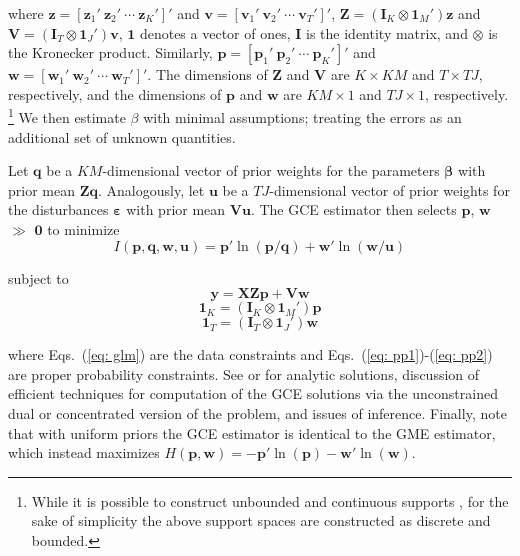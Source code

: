 \documentclass{elsarticle}
\begin{document}
\noindent
where $\mathbf{z}=[\mathbf{z}_1' ~ \mathbf{z}_2' ~ \cdots ~ 
\mathbf{z}_K' ]'$ and $\mathbf{v}=[\mathbf{v}_1' ~ \mathbf{v}_2' ~ 
\cdots ~ \mathbf{v}_T' ]'$, 
$\mathbf{Z}= (\mathbf{I}_K \otimes \mathbf{1}_M')\mathbf{z}$ and
$\mathbf{V}= (\mathbf{I}_T \otimes \mathbf{1}_J')\mathbf{v}$, $\mathbf{1}$ 
denotes a vector of ones, $\mathbf{I}$ is the 
identity matrix, and $\otimes$ is the Kronecker product.
Similarly, $\mathbf{p} = [\mathbf{p}_1' ~ \mathbf{p}_2' ~ \cdots ~ 
\mathbf{p}_K' ]'$ and $\mathbf{w} = [\mathbf{w}_1' ~ \mathbf{w}_2' 
~ \cdots ~ \mathbf{w}_T' ]'$.
The dimensions of $\mathbf{Z}$ and $\mathbf{V}$ are 
$K \times KM$ and $T \times TJ$, respectively, and the dimensions of 
$\mathbf{p}$ and $\mathbf{w}$ are $KM \times 1$ and $TJ \times 1$, 
respectively.%
\footnote{While it is possible to construct unbounded 
and continuous supports \citep{golan2012}, for the sake of simplicity the above 
support spaces are constructed as discrete and bounded.} 
We then estimate $\beta$ with minimal assumptions; treating the errors as an additional 
set of unknown quantities.

Let $\mathbf{q}$ be a $KM$-dimensional vector of prior weights for the 
parameters $\mathbf{\beta}$ with prior mean $\mathbf{Zq}$.
Analogously, let $\mathbf{u}$ be a $TJ$-dimensional vector of prior weights 
for the disturbances $\mathbf{\varepsilon}$ with prior mean $\mathbf{Vu}$.
The GCE estimator then selects $\mathbf{p}$, $\mathbf{w}$ $\gg$ 
$\mathbf{0}$ to minimize 
\begin{equation}
I({\mathbf{p}, \mathbf{q}, \mathbf{w}, \mathbf{u}}) = 
\mathbf{p}' \ln (\mathbf{p}/\mathbf{q}) + 
\mathbf{w}' \ln (\mathbf{w}/\mathbf{u})
\label{eq: ce}
\end{equation}

\noindent
subject to
\begin{equation}
\mathbf{y} = \mathbf{X Z p} 
+ \mathbf{V w}
\label{eq: glm}
\end{equation}
\begin{equation}
\mathbf{1}_K = (\mathbf{I}_K \otimes \mathbf{1}_M')\mathbf{p}
\label{eq: pp1}
\end{equation}
\begin{equation}
\mathbf{1}_T = (\mathbf{I}_T \otimes \mathbf{1}_J')\mathbf{w}
\label{eq: pp2}
\end{equation}

\noindent
where Eqs.\ (\ref{eq: glm}) are the data constraints and Eqs.\ 
(\ref{eq: pp1})-(\ref{eq: pp2}) are proper probability constraints.
See \citet[Chap.\ 6]{golan1996} or \citet[Chap.\ 6]{golan2008} for analytic solutions, 
discussion of efficient techniques for computation of the GCE solutions via the 
unconstrained dual or concentrated version of the problem, and issues of inference.
Finally, note that with uniform priors the GCE estimator is identical to 
the GME estimator, which instead maximizes $H(\mathbf{p},\mathbf{w}) 
= - \mathbf{p}' \ln (\mathbf{p}) - \mathbf{w}' \ln (\mathbf{w})$.
\end{document}
